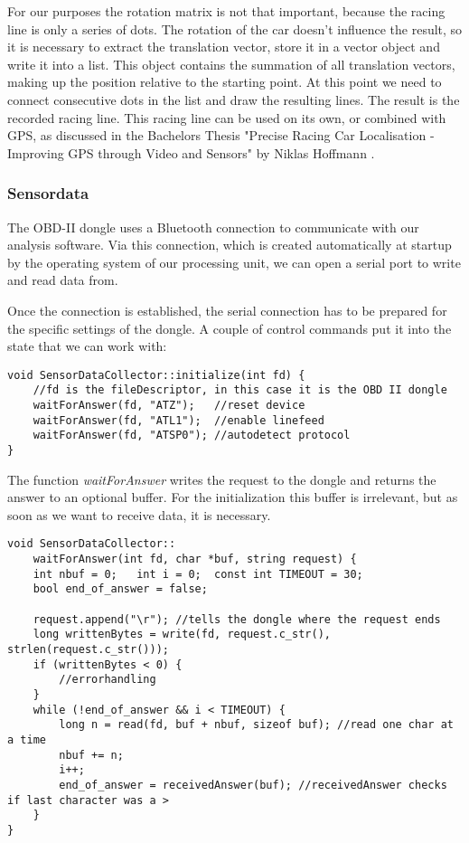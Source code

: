 For our purposes the rotation matrix is not that important, because the racing line is only a series of dots. The rotation of the car doesn't influence the result, so it is necessary to extract the translation vector, store it in a vector object and write it into a list. This object contains the summation of all translation vectors, making up the position relative to the starting point.
At this point we need to connect consecutive dots in the list and draw the resulting lines. The result is the recorded racing line.
\clearpage
This racing line can be used on its own, or combined with GPS, as discussed in the Bachelors Thesis "Precise Racing Car Localisation - Improving GPS through Video and Sensors" by Niklas Hoffmann \cite{hoffmann16}.

\subsubsection{Sensordata}
The OBD-II dongle uses a Bluetooth connection to communicate with our analysis software. Via this connection, which is created automatically at startup by the operating system of our processing unit, we can open a serial port to write and read data from.

Once the connection is established, the serial connection has to be prepared for the specific settings of the dongle.
A couple of control commands put it into the state that we can work with: 

\begin{lstlisting}
void SensorDataCollector::initialize(int fd) {
	//fd is the fileDescriptor, in this case it is the OBD II dongle
	waitForAnswer(fd, "ATZ");	//reset device
	waitForAnswer(fd, "ATL1");	//enable linefeed
	waitForAnswer(fd, "ATSP0");	//autodetect protocol
}
\end{lstlisting}

The function \textit{waitForAnswer} writes the request to the dongle and returns the answer to an optional buffer. For the initialization this buffer is irrelevant, but as soon as we want to receive data, it is necessary.
\clearpage
\begin{lstlisting}
void SensorDataCollector::
	waitForAnswer(int fd, char *buf, string request) {
	int nbuf = 0; 	int i = 0;	const int TIMEOUT = 30;
	bool end_of_answer = false;

	request.append("\r"); //tells the dongle where the request ends
	long writtenBytes = write(fd, request.c_str(), strlen(request.c_str()));
	if (writtenBytes < 0) {
		//errorhandling
	}
	while (!end_of_answer && i < TIMEOUT) {
		long n = read(fd, buf + nbuf, sizeof buf); //read one char at a time
		nbuf += n;
		i++;
		end_of_answer = receivedAnswer(buf); //receivedAnswer checks if last character was a >
	}
}
\end{lstlisting}


